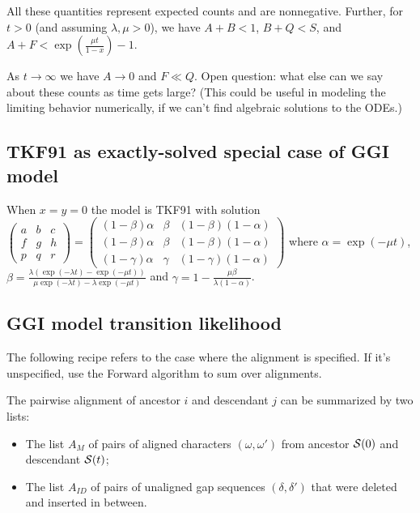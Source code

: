 \documentclass{article}
\begin{document}
All these quantities represent expected counts and are nonnegative.
Further, for $t>0$ (and assuming $\lambda,\mu > 0$), we have
$A+B<1$, $B+Q<S$, and $A+F < \exp\left(\frac{\mu t}{1-x}\right) - 1$.

As $t \to \infty$ we have $A \to 0$ and $F \ll Q$.
Open question: what else can we say about these counts as time gets large?
(This could be useful in modeling the limiting behavior numerically, if we can't find algebraic solutions to the ODEs.)

\subsection{TKF91 as exactly-solved special case of GGI model}

When $x=y=0$ the model is TKF91 \cite{ThorneEtAl91}
with solution
$
\begin{pmatrix}
a & b & c \\
f & g & h \\
p & q & r 
\end{pmatrix}
=
\begin{pmatrix}
(1-\beta)\alpha & \beta & (1-\beta)(1-\alpha) \\
(1-\beta)\alpha & \beta & (1-\beta)(1-\alpha) \\
(1-\gamma)\alpha & \gamma & (1-\gamma)(1-\alpha)
\end{pmatrix}
$
where
$\alpha = \exp(-\mu t)$,
$\beta = \frac{\lambda \left( \exp(-\lambda t) - \exp(-\mu t) \right)}{\mu \exp(-\lambda t) - \lambda \exp(-\mu t)}$
and
$\gamma = 1 - \frac{\mu \beta}{\lambda (1 - \alpha)}$.



\subsection{GGI model transition likelihood}

The following recipe refers to the case where the alignment is specified.
If it's unspecified, use the Forward algorithm to sum over alignments.

The pairwise alignment of ancestor $i$ and descendant $j$ can be summarized by two lists:
\begin{itemize}
    \item The list $A_M$ of pairs of aligned characters $(\omega,\omega')$ from ancestor ${\cal S}(0)$ and descendant ${\cal S}(t)$;
    \item The list $A_{ID}$ of pairs of unaligned gap sequences $(\delta,\delta')$ that were deleted and inserted in between.
\end{itemize}
\end{document}

